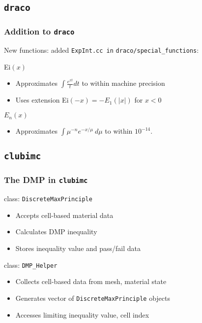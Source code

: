 \documentclass{beamer}
\begin{document}
\subsection{\texttt{draco}}
\begin{frame}\frametitle{Addition to \texttt{draco}}\label{origEiEn}
New functions: added \texttt{ExpInt.cc in}
\texttt{draco/special\_functions}:
\begin{block}{Ei$(x)$ \hyperlink{Ei_exp}{}}
\begin{itemize}
 \item Approximates $\int\frac{e^{xt}}{t}dt$ to within machine
precision
  \item Uses extension Ei$(-x) = -E_1(|x|)$ for $x<0$
\end{itemize}
\end{block}

\begin{block}{$E_n(x)$ \hyperlink{En_exp}{}}
\begin{itemize}
\item Approximates $\int\mu^{-n}e^{-x/\mu}\ d\mu$ to within $10^{-14}$.
\end{itemize}
\end{block}
\end{frame}


\subsection{\texttt{clubimc}}
\begin{frame}\frametitle{The DMP in \texttt{clubimc}}
\begin{block}{class: \texttt{DiscreteMaxPrinciple}}
\begin{itemize}
 \item Accepts cell-based material data
 \item Calculates DMP inequality
 \item Stores inequality value and pass/fail data
\end{itemize}
\end{block}
\begin{block}{class: \texttt{DMP\_Helper}}
\begin{itemize}
 \item Collects cell-based data from mesh, material state
 \item Generates vector of \texttt{DiscreteMaxPrinciple} objects
 \item Accesses limiting inequality value, cell index
\end{itemize}
\end{block}
\end{frame}
\end{document}
